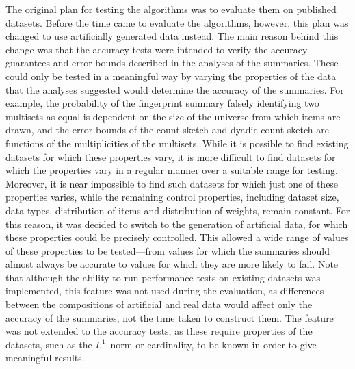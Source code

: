 The original plan for testing the algorithms was to evaluate them on published datasets.
Before the time came to evaluate the algorithms, however, this plan was changed to use artificially generated data instead.
The main reason behind this change was that the accuracy tests were intended to verify the accuracy guarantees and error bounds described in the analyses of the summaries.
These could only be tested in a meaningful way by varying the properties of the data that the analyses suggested would determine the accuracy of the summaries.
For example, the probability of the fingerprint summary falsely identifying two multisets as equal is dependent on the size of the universe from which items are drawn, and the error bounds of the count sketch and dyadic count sketch are functions of the multiplicities of the multisets.
While it is possible to find existing datasets for which these properties vary, it is more difficult to find datasets for which the properties vary in a regular manner over a suitable range for testing.
Moreover, it is near impossible to find such datasets for which just one of these properties varies, while the remaining control properties, including dataset size, data types, distribution of items and distribution of weights, remain constant.
For this reason, it was decided to switch to the generation of artificial data, for which these properties could be precisely controlled.
This allowed a wide range of values of these properties to be tested---from values for which the summaries should almost always be accurate to values for which they are more likely to fail.
Note that although the ability to run performance tests on existing datasets was implemented, this feature was not used during the evaluation, as differences between the compositions of artificial and real data would affect only the accuracy of the summaries, not the time taken to construct them.
The feature was not extended to the accuracy tests, as these require properties of the datasets, such as the \( L^{1} \)~norm or cardinality, to be known in order to give meaningful results.

